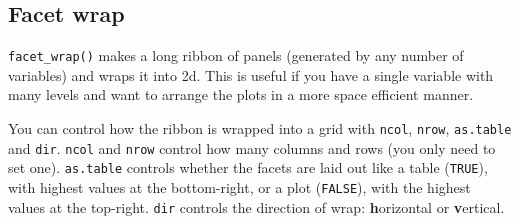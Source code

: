 \begin{Shaded}
\end{Shaded}

\hypertarget{sub:facet-wrap}{%
\subsection{Facet wrap}\label{sub:facet-wrap}}

\texttt{facet\_wrap()} makes a long ribbon of panels (generated by any
number of variables) and wraps it into 2d. This is useful if you have a
single variable with many levels and want to arrange the plots in a more
space efficient manner.  
\indexc{\textasciitilde}

You can control how the ribbon is wrapped into a grid with
\texttt{ncol}, \texttt{nrow}, \texttt{as.table} and \texttt{dir}.
\texttt{ncol} and \texttt{nrow} control how many columns and rows (you
only need to set one). \texttt{as.table} controls whether the facets are
laid out like a table (\texttt{TRUE}), with highest values at the
bottom-right, or a plot (\texttt{FALSE}), with the highest values at the
top-right. \texttt{dir} controls the direction of wrap:
\textbf{h}orizontal or \textbf{v}ertical.

\begin{Shaded}
\begin{Highlighting}[]
\StringTok{ }\OperatorTok{+}\StringTok{ }
\StringTok{  }\NormalTok{() }\OperatorTok{+}\StringTok{ }
\StringTok{  }\NormalTok{(}\NormalTok{) }\OperatorTok{+}\StringTok{ }
\StringTok{  }\NormalTok{(}\NormalTok{)}

\OperatorTok{+}\StringTok{ }\NormalTok{(}\OperatorTok{~} \NormalTok{)}
\OperatorTok{+}\StringTok{ }\NormalTok{(}\OperatorTok{~} \NormalTok{, } \NormalTok{)}
\end{Highlighting}
\end{Shaded}

